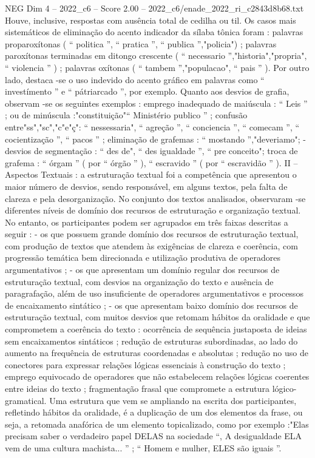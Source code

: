 \begin{textsample}{NEG Dim 4 – 2022\_c6 – Score 2.00 – 2022\_c6/enade\_2022\_ri\_c2843d8b68.txt}
Houve, inclusive, respostas com ausência total de cedilha ou til.
Os casos mais sistemáticos de eliminação do acento indicador da sílaba tônica foram : palavras proparoxítonas ( “ politica ”, “ pratica ”, “ publica ”,"policia") ; palavras paroxítonas terminadas em ditongo crescente ( “ necessario ”,"historia","propria", “ violencia ” ) ; palavras oxítonas ( “ tambem ”,"populacao", “ pais ” ).
Por outro lado, destaca -se o uso indevido do acento gráfico em palavras como “ investímento ” e “ pátriarcado ”, por exemplo.
Quanto aos desvios de grafia, observam -se os seguintes exemplos : emprego inadequado de maiúscula : “ Leis ” ; ou de minúscula :"constituição"“ Ministério publico ” ; confusão entre"ss","sc","c"e"ç": “ nessessaria", “ agreção ”, “ conciencia ”, “ comecam ”, “ cocientização ”, “ pacos ” ; eliminação de grafemas : “ mostando ”,"deveriamo"; - desvios de segmentação : “ des de", “ des igualdade ”, “ pre conceito"; troca de grafema : “ órgam ” ( por “ órgão ” ), “ escravido ” ( por “ escravidão ” ).
II – Aspectos Textuais : a estruturação textual foi a competência que apresentou o maior número de desvios, sendo responsável, em alguns textos, pela falta de clareza e pela desorganização.
No conjunto dos textos analisados, observaram -se diferentes níveis de domínio dos recursos de estruturação e organização textual.
No entanto, os participantes podem ser agrupados em três faixas descritas a seguir : - os que possuem grande domínio dos recursos de estruturação textual, com produção de textos que atendem às exigências de clareza e coerência, com progressão temática bem direcionada e utilização produtiva de operadores argumentativos ; - os que apresentam um domínio regular dos recursos de estruturação textual, com desvios na organização do texto e ausência de paragrafação, além de uso insuficiente de operadores argumentativos e processos de encaixamento sintático ; - os que apresentam baixo domínio dos recursos de estruturação textual, com muitos desvios que retomam hábitos da oralidade e que comprometem a coerência do texto : ocorrência de sequência justaposta de ideias sem encaixamentos sintáticos ; redução de estruturas subordinadas, ao lado do aumento na frequência de estruturas coordenadas e absolutas ; redução no uso de conectores para expressar relações lógicas essenciais à construção do texto ; emprego equivocado de operadores que não estabelecem relações lógicas coerentes entre ideias do texto ; fragmentação frasal que compromete a estrutura lógico-gramatical.
Uma estrutura que vem se ampliando na escrita dos participantes, refletindo hábitos da oralidade, é a duplicação de um dos elementos da frase, ou seja, a retomada anafórica de um elemento topicalizado, como por exemplo :"Elas precisam saber o verdadeiro papel DELAS na sociedade “, A desigualdade ELA vem de uma cultura machista... ” ; “ Homem e mulher, ELES são iguais ”.

\end{textsample}

